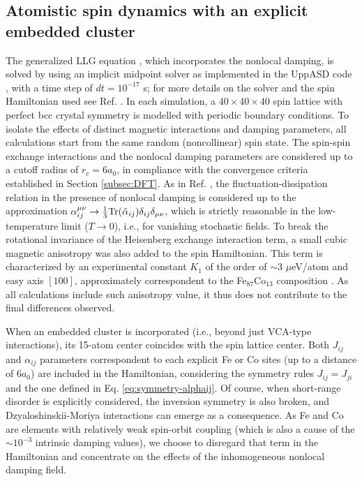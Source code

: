 \subsection{Atomistic spin dynamics with an explicit embedded cluster}

The generalized LLG equation \cite{PhysRevB.109.094417,PhysRevMaterials.2.013801,PhysRevB.108.014433,PhysRevB.73.184427}, which incorporates the nonlocal damping, is solved by using an implicit midpoint solver as implemented in the UppASD code \cite{UppASD}, with a time step of $dt=10^{-17}$ s; for more details on the solver and the spin Hamiltonian used see Ref. \cite{PhysRevB.108.014433}. In each simulation, a $40\times40\times40$ spin lattice with perfect bcc crystal symmetry is modelled with periodic boundary conditions. To isolate the effects of distinct magnetic interactions and damping parameters, all calculations start from the same random (noncollinear) spin state. The spin-spin exchange interactions and the nonlocal damping parameters are considered up to a cutoff radius of $r_c=6a_0$, in compliance with the convergence criteria established in Section \ref{subsec:DFT}. As in Ref. \cite{PhysRevB.108.014433}, the fluctuation-dissipation relation in the presence of nonlocal damping is considered up to the approximation $\alpha_{ij}^{\mu\nu}\rightarrow\frac{1}{3}\textnormal{Tr}(\hat{\alpha}_{ij})\delta_{ij}\delta_{\mu\nu}$, which is strictly reasonable in the low-temperature limit ($T\rightarrow0$), i.e., for vanishing stochastic fields. To break the rotational invariance of the Heisenberg exchange interaction term, a small cubic magnetic anisotropy was also added to the spin Hamiltonian. This term is characterized by an experimental constant $K_1$ of the order of $\sim3$ $\mu$eV/atom and easy axis $[100]$, approximately correspondent to the Fe$_{87}$Co$_{13}$ composition \cite{Pfeifer1980}. As all calculations include such anisotropy value, it thus does not contribute to the final differences observed.

When an embedded cluster is incorporated (i.e., beyond just VCA-type interactions), its 15-atom center coincides with the spin lattice center. Both $J_{ij}$ and $\alpha_{ij}$ parameters correspondent to each explicit Fe or Co sites (up to a distance of $6a_0$) are included in the Hamiltonian, considering the symmetry rules $J_{ij}=J_{ji}$ and the one defined in Eq. \ref{eq:symmetry-alphaij}. Of course, when short-range disorder is explicitly considered, the inversion symmetry is also broken, and Dzyaloshinskii-Moriya interactions can emerge as a consequence. As Fe and Co are elements with relatively weak spin-orbit coupling (which is also a cause of the $\sim10^{-3}$ intrinsic damping values), we choose to disregard that term in the Hamiltonian and concentrate on the effects of the inhomogeneous nonlocal damping field.


